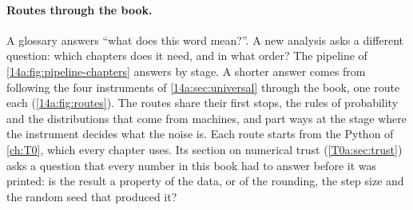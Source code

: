 \paragraph{Routes through the book.}
A glossary answers ``what does this word mean?''. A new analysis asks a different
question: which chapters does it need, and in what order? The pipeline of
\cref{14a:fig:pipeline-chapters} answers by stage. A shorter answer comes from
following the four instruments of \cref{14a:sec:universal} through the book, one
route each (\cref{14a:fig:routes}). The routes share their first stops, the rules of
probability and the distributions that come from machines, and part ways at the stage
where the instrument decides what the noise is. Each route starts from the Python of
\cref{ch:T0}, which every chapter uses. Its section on numerical trust (\cref{T0a:sec:trust}) asks a question that every
number in this book had to answer before it was printed: is the result a property of
the data, or of the rounding, the step size and the random seed that produced it?

